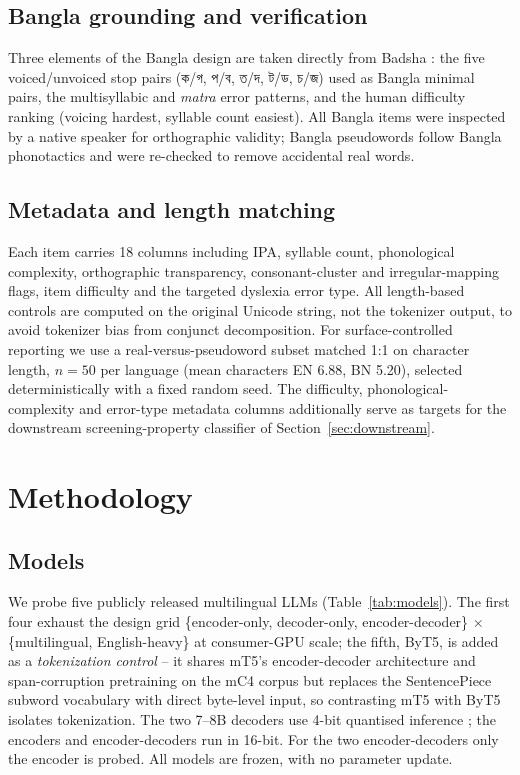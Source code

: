 \documentclass[preprint,12pt]{elsarticle}
\newcommand{\bn}[1]{{\banglafont #1}}
\begin{document}
\subsection{Bangla grounding and verification}
Three elements of the Bangla design are taken directly from Badsha \cite{badsha2024mall}: the five voiced/unvoiced stop pairs (\bn{ক/গ}, \bn{প/ব}, \bn{ত/দ}, \bn{ট/ড}, \bn{চ/জ}) used as Bangla minimal pairs, the multisyllabic and \textit{matra} error patterns, and the human difficulty ranking (voicing hardest, syllable count easiest). All Bangla items were inspected by a native speaker for orthographic validity; Bangla pseudowords follow Bangla phonotactics and were re-checked to remove accidental real words.

\subsection{Metadata and length matching}
Each item carries 18 columns including IPA, syllable count, phonological complexity, orthographic transparency, consonant-cluster and irregular-mapping flags, item difficulty and the targeted dyslexia error type. All length-based controls are computed on the original Unicode string, not the tokenizer output, to avoid tokenizer bias from conjunct decomposition. For surface-controlled reporting we use a real-versus-pseudoword subset matched 1:1 on character length, $n=50$ per language (mean characters EN 6.88, BN 5.20), selected deterministically with a fixed random seed. The difficulty, phonological-complexity and error-type metadata columns additionally serve as targets for the downstream screening-property classifier of Section~\ref{sec:downstream}.

\section{Methodology}
\label{sec:method}
\subsection{Models}
We probe five publicly released multilingual LLMs (Table~\ref{tab:models}). The first four exhaust the design grid \{encoder-only, decoder-only, encoder-decoder\} $\times$ \{multilingual, English-heavy\} at consumer-GPU scale; the fifth, ByT5, is added as a \emph{tokenization control} -- it shares mT5's encoder-decoder architecture and span-corruption pretraining on the mC4 corpus but replaces the SentencePiece subword vocabulary with direct byte-level input, so contrasting mT5 with ByT5 isolates tokenization. The two 7--8B decoders use 4-bit quantised inference \cite{dettmers2022bnb,dettmers2023qlora}; the encoders and encoder-decoders run in 16-bit. For the two encoder-decoders only the encoder is probed. All models are frozen, with no parameter update.
\end{document}
